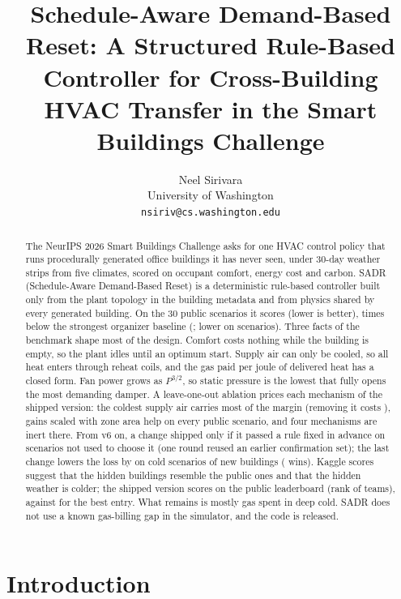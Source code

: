 \documentclass{article}
\title{Schedule-Aware Demand-Based Reset: A Structured Rule-Based Controller for Cross-Building HVAC Transfer in the Smart Buildings Challenge}
\author{%
  Neel Sirivara\\
  University of Washington\\
  \texttt{nsiriv@cs.washington.edu}
}
\begin{document}
\maketitle

\begin{abstract}
The NeurIPS 2026 Smart Buildings Challenge asks for one HVAC control policy that runs procedurally generated office buildings it has never seen, under 30-day weather strips from five climates, scored on occupant comfort, energy cost and carbon. SADR (Schedule-Aware Demand-Based Reset) is a deterministic rule-based controller built only from the plant topology in the building metadata and from physics shared by every generated building. On the 30 public scenarios it scores \RTenConfPubCand{} (lower is better), \RElvPwTimes{} times below the strongest organizer baseline (\MetricPidWater; lower on \RElvPwWins{} scenarios). Three facts of the benchmark shape most of the design. Comfort costs nothing while the building is empty, so the plant idles until an optimum start. Supply air can only be cooled, so all heat enters through reheat coils, and the gas paid per joule of delivered heat has a closed form. Fan power grows as $P^{3/2}$, so static pressure is the lowest that fully opens the most demanding damper. A leave-one-out ablation prices each mechanism of the shipped version: the coldest supply air carries most of the margin (removing it costs \RElvAbSatRel), gains scaled with zone area help on every public scenario, and four mechanisms are inert there. From v6 on, a change shipped only if it passed a rule fixed in advance on scenarios not used to choose it (one round reused an earlier confirmation set); the last change lowers the loss by \RTenConfHarshCThreeRelAbs{} on \RTenConfHarshCThreeN{} cold scenarios of \RTenNNewBuild{} new buildings (\RTenConfHarshCThreeWins{} wins). Kaggle scores suggest that the hidden buildings resemble the public ones and that the hidden weather is colder; the shipped version scores \RTenKagVTwelve{} on the public leaderboard (rank \RElvKagRank{} of \RElvKagTeams{} teams), against \RElvKagBest{} for the best entry. What remains is mostly gas spent in deep cold. SADR does not use a known gas-billing gap in the simulator, and the code is released.
\end{abstract}

\section{Introduction}
\end{document}

